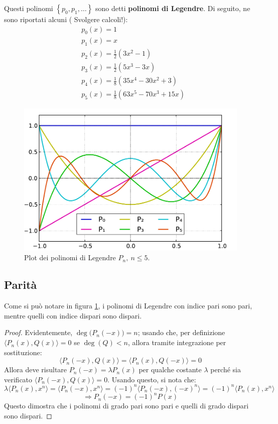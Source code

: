 \documentclass[11pt, a4paper]{scrartcl}
\theoremstyle{definition}
\numberwithin{esempio}{section}
\theoremstyle{definition}
\numberwithin{obs}{section}
\numberwithin{nota}{section}
\numberwithin{equation}{subsection}
\begin{document}
Questi polinomi $\left\{ p_0,p_1,\ldots \right\} $ sono detti \textbf{polinomi di Legendre}. 
Di seguito, ne sono riportati alcuni ({\color{red} Svolgere calcoli!}):
\[
	\begin{split}
		&p_0(x) = 1\\
		&p_1(x)= x\\
		&p_2(x) = \frac{1}{2}(3x^2 -1)\\
		&p_3(x) = \frac{1}{2}(5x^3-3x)\\
		&p_4(x) = \frac{1}{8}(35x^4-30x^2+3)\\
		&p_5(x) = \frac{1}{8}(63x^5 -70x^3+15x)
	\end{split}
\] 
\begin{figure}[h!]
	\centering
	\includegraphics[width=.6\columnwidth]{lp-plot.pdf}
	\caption{Plot dei polinomi di Legendre $P_n, \ n\le 5$.}
	\label{lpplot}
\end{figure}
\subsection{Parit\`a}
Come si pu\`o notare in figura \ref{lpplot}, i polinomi di Legendre con indice pari sono pari, mentre quelli con indice dispari sono dispari.
\begin{proof}
Evidentemente, $\operatorname{deg} \big(P_n(-x)\big) = n$; usando che, per definizione $\langle P_n(x) ,Q(x) \rangle=0$ se $\operatorname{deg} (Q) < n$, allora tramite integrazione per sostituzione:
\[
\big\langle P_n(-x) , Q(x)  \big\rangle = \big\langle P_n(x) , Q(-x) \big\rangle=0
\] 
Allora deve risultare $P_n(-x) = \lambda P_n(x)$ per qualche costante $\lambda $ perch\'e sia verificato $\langle P_n(-x) , Q(x) \rangle=0$.
Usando questo, si nota che:
\[
		\lambda \langle P_n(x) , x^n \rangle= \langle P_n(-x), x^n \rangle = (-1)^n \langle P_n(-x) , (-x)^n \rangle = (-1)^n \langle P_n(x),x^n \rangle
	\]
	\[
		\Rightarrow P_n(-x) = (-1)^n P(x)
\] 
Questo dimostra che i polinomi di grado pari sono pari e quelli di grado dispari sono dispari.
\end{proof}
\end{document}

